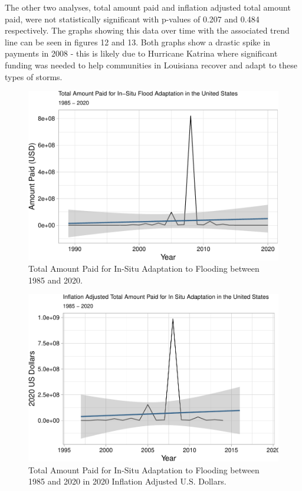 \documentclass[
  12pt,
]{article}
\begin{document}
The other two analyses, total amount paid and inflation adjusted total
amount paid, were not statistically significant with p-values of 0.207
and 0.484 respectively. The graphs showing this data over time with the
associated trend line can be seen in figures 12 and 13. Both graphs show
a drastic spike in payments in 2008 - this is likely due to Hurricane
Katrina where significant funding was needed to help communities in
Louisiana recover and adapt to these types of storms.

\begin{figure}
\centering
\includegraphics{finalreport_files/figure-latex/unnamed-chunk-20-1.pdf}
\caption{Total Amount Paid for In-Situ Adaptation to Flooding between
1985 and 2020.}
\end{figure}

\begin{figure}
\centering
\includegraphics{finalreport_files/figure-latex/unnamed-chunk-21-1.pdf}
\caption{Total Amount Paid for In-Situ Adaptation to Flooding between
1985 and 2020 in 2020 Inflation Adjusted U.S. Dollars.}
\end{figure}
\end{document}
